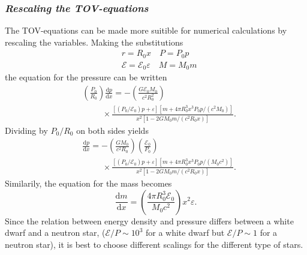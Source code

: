 \documentclass[twocolumn]{article}
\begin{document}
\begin{large}
\subsubsection*{\textit{Rescaling the TOV-equations}}
The TOV-equations can be made more suitible for numerical calculations by rescaling the variables. Making the substitutions  
\begin{equation*}
    \begin{split}
        &r = R_0x \quad P=P_0p \\ 
        &\mathcal{E} = \mathcal{E}_0\varepsilon \quad M = M_0m
    \end{split}
\end{equation*}
the equation for the pressure can be written
\begin{equation}
    \begin{split}
        &\left(\frac{P_0}{R_0}\right)\frac{\text{d}p}{\text{d}x} = -\left(\frac{G\mathcal{E}_0M_0}{c^2R_0^2}\right) \\ 
        &\hspace{1cm}\times \frac{\left[(P_0/\mathcal{E}_0)p+\varepsilon\right]\left[m+4\pi R_0^3x^3P_0p/(c^2M_0)\right]}{x^2\left[1-2GM_0m/(c^2R_0x)\right]}.
    \end{split}
\end{equation}
Dividing by $P_0/R_0$ on both sides yields
\begin{equation}
    \label{28maj1116}
    \begin{split}
        &\frac{\text{d}p}{\text{d}x} = -\left(\frac{GM_0}{c^2R_0}\right)\left(\frac{\mathcal{E}_0}{P_0}\right) \\ 
        &\hspace{1cm}\times \frac{\left[(P_0/\mathcal{E}_0)p+\varepsilon\right]\left[m+4\pi R_0^3x^3P_0p/(M_0c^2)\right]}{x^2\left[1-2GM_0m/(c^2R_0x)\right]}.
    \end{split}
\end{equation}
Similarily, the equation for the mass becomes
\begin{equation}
    \label{28maj1130}
    \frac{\text{d}m}{\text{d}x} = \left(\frac{4\pi R_0^3\mathcal{E}_0}{M_0c^2}\right)x^2\varepsilon.
\end{equation}
Since the relation between energy density and pressure differs between a white dwarf and a neutron star, ($\mathcal{E}/P\sim 10^3$ for a white dwarf but $\mathcal{E}/P\sim 1$ for a neutron star), it is best to choose different scalings for the different type of stars.


\end{large}
\end{document}
